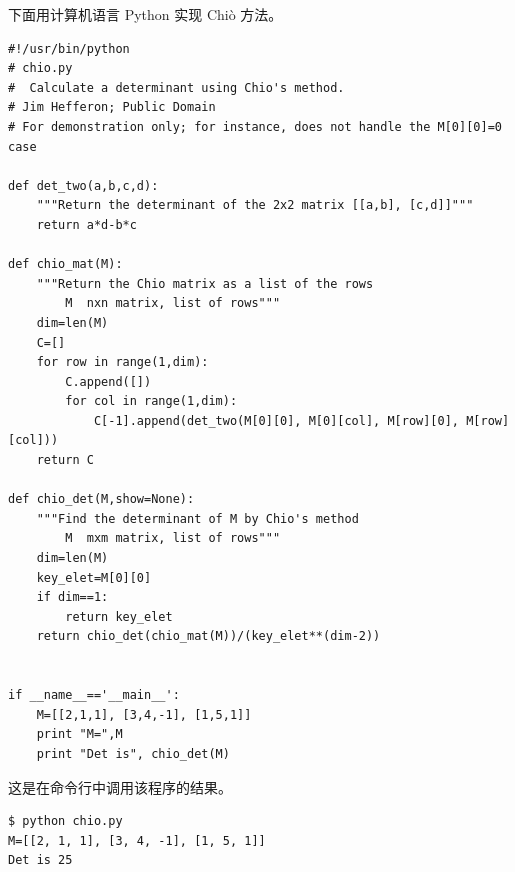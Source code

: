 \announcecomputercode
下面用计算机语言 Python 实现 Chiò 方法。
\begin{lstlisting}
#!/usr/bin/python
# chio.py
#  Calculate a determinant using Chio's method.
# Jim Hefferon; Public Domain
# For demonstration only; for instance, does not handle the M[0][0]=0 case

def det_two(a,b,c,d):
    """Return the determinant of the 2x2 matrix [[a,b], [c,d]]"""
    return a*d-b*c

def chio_mat(M):
    """Return the Chio matrix as a list of the rows
        M  nxn matrix, list of rows"""
    dim=len(M)
    C=[]
    for row in range(1,dim):
        C.append([])
        for col in range(1,dim):  
            C[-1].append(det_two(M[0][0], M[0][col], M[row][0], M[row][col]))
    return C

def chio_det(M,show=None):
    """Find the determinant of M by Chio's method
        M  mxm matrix, list of rows"""
    dim=len(M)
    key_elet=M[0][0]
    if dim==1:
        return key_elet
    return chio_det(chio_mat(M))/(key_elet**(dim-2))


if __name__=='__main__':
    M=[[2,1,1], [3,4,-1], [1,5,1]]
    print "M=",M
    print "Det is", chio_det(M)
\end{lstlisting}
这是在命令行中调用该程序的结果。
\begin{lstlisting}
$ python chio.py
M=[[2, 1, 1], [3, 4, -1], [1, 5, 1]]
Det is 25
\end{lstlisting}
\endinput
